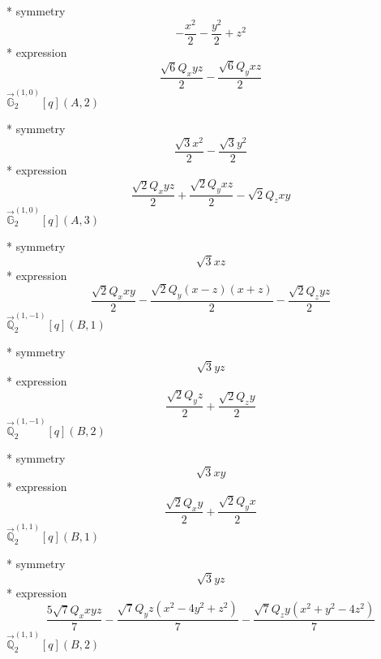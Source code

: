 \documentclass[fleqn,8pt]{jsarticle}
\begin{document}
\noindent\quad ** symmetry
\begin{dmath*}
- \frac{x^{2}}{2} - \frac{y^{2}}{2} + z^{2}
\end{dmath*}
\noindent\quad ** expression
\begin{dmath*}
\frac{\sqrt{6} Q_{x} y z}{2} - \frac{\sqrt{6} Q_{y} x z}{2}
\end{dmath*}
\noindent\quad $\vec{\mathbb{G}}_{2}^{(1,0)}[q](A,2)$

\noindent\quad ** symmetry
\begin{dmath*}
\frac{\sqrt{3} x^{2}}{2} - \frac{\sqrt{3} y^{2}}{2}
\end{dmath*}
\noindent\quad ** expression
\begin{dmath*}
\frac{\sqrt{2} Q_{x} y z}{2} + \frac{\sqrt{2} Q_{y} x z}{2} - \sqrt{2} Q_{z} x y
\end{dmath*}
\noindent\quad $\vec{\mathbb{G}}_{2}^{(1,0)}[q](A,3)$

\noindent\quad ** symmetry
\begin{dmath*}
\sqrt{3} x z
\end{dmath*}
\noindent\quad ** expression
\begin{dmath*}
\frac{\sqrt{2} Q_{x} x y}{2} - \frac{\sqrt{2} Q_{y} \left(x - z\right) \left(x + z\right)}{2} - \frac{\sqrt{2} Q_{z} y z}{2}
\end{dmath*}
\noindent\quad $\vec{\mathbb{Q}}_{2}^{(1,-1)}[q](B,1)$

\noindent\quad ** symmetry
\begin{dmath*}
\sqrt{3} y z
\end{dmath*}
\noindent\quad ** expression
\begin{dmath*}
\frac{\sqrt{2} Q_{y} z}{2} + \frac{\sqrt{2} Q_{z} y}{2}
\end{dmath*}
\noindent\quad $\vec{\mathbb{Q}}_{2}^{(1,-1)}[q](B,2)$

\noindent\quad ** symmetry
\begin{dmath*}
\sqrt{3} x y
\end{dmath*}
\noindent\quad ** expression
\begin{dmath*}
\frac{\sqrt{2} Q_{x} y}{2} + \frac{\sqrt{2} Q_{y} x}{2}
\end{dmath*}
\noindent\quad $\vec{\mathbb{Q}}_{2}^{(1,1)}[q](B,1)$

\noindent\quad ** symmetry
\begin{dmath*}
\sqrt{3} y z
\end{dmath*}
\noindent\quad ** expression
\begin{dmath*}
\frac{5 \sqrt{7} Q_{x} x y z}{7} - \frac{\sqrt{7} Q_{y} z \left(x^{2} - 4 y^{2} + z^{2}\right)}{7} - \frac{\sqrt{7} Q_{z} y \left(x^{2} + y^{2} - 4 z^{2}\right)}{7}
\end{dmath*}
\noindent\quad $\vec{\mathbb{Q}}_{2}^{(1,1)}[q](B,2)$
\end{document}
